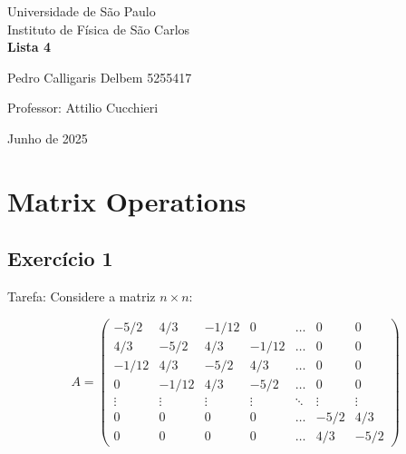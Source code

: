 \documentclass[12pt, a4paper]{article} %
\begin{document}
	
	\begin{titlepage}
		\begin{center}
\Huge{Universidade de São Paulo}\\
\large{Instituto de Física de São Carlos}\\
\vspace{20pt}
\vspace{200pt}
\textbf{Lista 4}\\
\vspace{8cm}
		\end{center}

\begin{flushleft}
\begin{tabbing}
Pedro Calligaris Delbem 5255417\\
\end{tabbing}
\vspace{0.5cm}
Professor: Attilio Cucchieri\\		
		\end{flushleft}
	
		\begin{center}
			\vspace{\fill}
	Junho de 2025	
		\end{center}
	\end{titlepage}

	\tableofcontents 
	\thispagestyle{empty}
	\newpage

\section{Matrix Operations}

    \subsection{Exerc\'icio 1}

        Tarefa: Considere a matriz $n \times n$:

        $$
        A = 
        \begin{pmatrix}
        -5/2 & 4/3 & -1/12 & 0 & \dots & 0 & 0 \\
        4/3 & -5/2 & 4/3 & -1/12 & \dots & 0 & 0 \\
        -1/12 & 4/3 & -5/2 & 4/3 & \dots & 0 & 0 \\
        0 & -1/12 & 4/3 & -5/2 & \dots & 0 & 0 \\
        \vdots & \vdots & \vdots & \vdots & \ddots & \vdots & \vdots \\
        0 & 0 & 0 & 0 & \dots & -5/2 & 4/3 \\
        0 & 0 & 0 & 0 & \dots & 4/3 & -5/2 
        \end{pmatrix}
        $$
        
\end{document}
